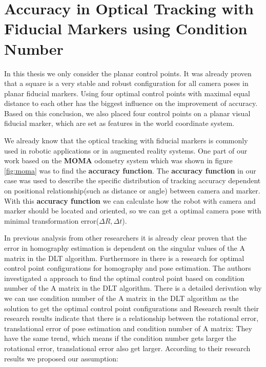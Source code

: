 \chapter{Accuracy in Optical Tracking with Fiducial Markers using Condition Number}
\label{chap:Accuracy in Optical Tracking with Fiducial Markers using Condition Number}

In this thesis we only consider the planar control points.
It was already proven that a square is a very stable and robust configuration for all camera poses in planar fiducial markers. Using four optimal control points with maximal equal distance to each other has the biggest influence on the improvement of accuracy\cite{dynamic_markers}.
Based on this conclusion, we also placed four control points on a planar visual fiducial marker, which are set as features in the world coordinate system.

We already know that the optical tracking with fiducial markers is commonly used in robotic applications or in augmented reality systems. One part of our work based on the \textbf{MOMA} odometry system which was shown in figure \ref{fig:moma} was to find the \textbf{accuracy function}. The \textbf{accuracy function} in our case was used to describe the specific distribution of tracking
accuracy dependent on positional relationship(such as distance or angle) between camera and marker. With this \textbf{accuracy function} we can calculate how the robot with camera and marker should be located and oriented, so we can get a optimal camera pose with minimal transformation error($\Delta R, \Delta t$).

In previous analysis from other researchers it is already clear proven that the error in homography estimation is dependent on the singular values of the A matrix in the DLT algorithm\cite{chen2009error}.
Furthermore in \cite{dynamic_markers}
there is a research for optimal control point configurations for homography and pose estimation. The authors investigated a approach to find the optimal control point based on condition number of the A matrix in the DLT algorithm. There is a detailed derivation why we can use condition number of the A matrix in the DLT algorithm as the solution to get the optimal control point configurations and Research result
their research results indicate that there is a relationship between the rotational error, translational error of pose estimation and condition number of A matrix: They have the same trend, which means if the condition number gets larger the rotational error, translational error also get larger.
According to their research results we proposed our assumption:

